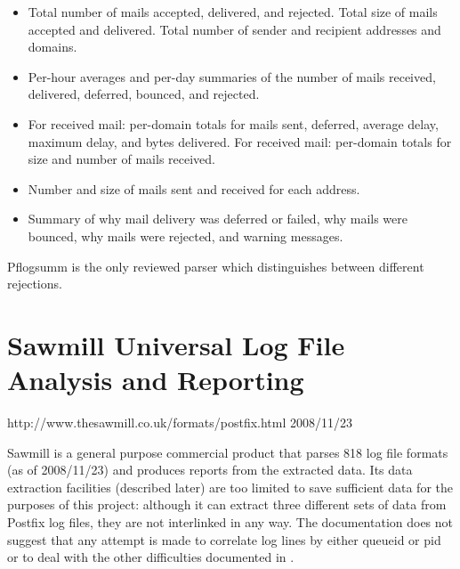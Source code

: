 \begin{itemize}

    \item Total number of mails accepted, delivered, and rejected.  Total
        size of mails accepted and delivered.  Total number of sender and
        recipient addresses and domains.

    \item Per-hour averages and per-day summaries of the number of mails
        received, delivered, deferred, bounced, and rejected.

    \item For received mail: per-domain totals for mails sent, deferred,
        average delay, maximum delay, and bytes delivered.  For received
        mail: per-domain totals for size and number of mails received.

    \item Number and size of mails sent and received for each address.

    \item Summary of why mail delivery was deferred or failed, why mails
        were bounced, why mails were rejected, and warning messages.

\end{itemize}

Pflogsumm is the only reviewed parser which distinguishes between different
rejections.

\section{Sawmill Universal Log File Analysis and Reporting}

{http://www.thesawmill.co.uk/formats/postfix.html}
{2008/11/23}

Sawmill is a general purpose commercial product that parses 818 log file
formats (as of 2008/11/23) and produces reports from the extracted data.
Its data extraction facilities (described later) are too limited to save
sufficient data for the purposes of this project: although it can extract
three different sets of data from Postfix log files, they are not
interlinked in any way.  The documentation does not suggest that any
attempt is made to correlate log lines by either queueid or pid or to deal
with the other difficulties documented in .

